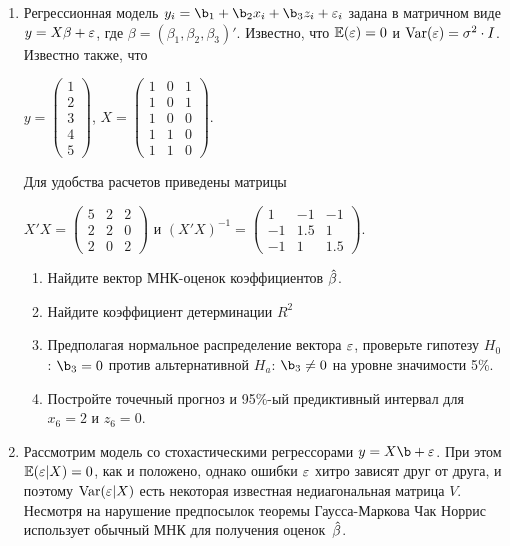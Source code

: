 \documentclass[12pt, a4paper]{article}
\theoremstyle{definition}
\begin{document}
\begin{enumerate}
\item Регрессионная модель $y_i=\b_1 + \b_2 x_i + \b_3 z_i + \e_i$  задана в матричном виде  $y=X\beta+\varepsilon$, где $\beta=(\beta_1,\beta_2,\beta_3)'$.
Известно, что $\operatorname{\mathbb{E}}(\varepsilon)=0$  и  $\operatorname{Var}(\varepsilon)=\sigma^2\cdot I$.
Известно также, что

$y=\left(
\begin{array}{c}
1\\
2\\
3\\
4\\
5
\end{array}\right)$,
$X=\left(\begin{array}{ccc}
1 & 0 & 1 \\
1 & 0 & 1 \\
1 & 0 & 0 \\
1 & 1 & 0 \\
1 & 1 & 0
\end{array}\right)$.


Для удобства расчетов приведены матрицы


$X'X=\left(
\begin{array}{ccc}
5 & 2 & 2\\
2 & 2 & 0\\
2 & 0 & 2
\end{array}\right)$ и $(X'X)^{-1}=\left(
\begin{array}{ccc}
1 & -1 & -1 \\
-1 & 1.5 & 1 \\
-1 & 1 & 1.5
\end{array}\right)$.

\begin{enumerate}
\item Найдите вектор МНК-оценок коэффициентов $\hat{\beta}$.
\item Найдите коэффициент детерминации $R^2$
\item Предполагая нормальное распределение вектора $\varepsilon$, проверьте гипотезу $H_0$: $\b_3=0$ против альтернативной $H_a$: $\b_3\neq 0$ на уровне значимости 5\%.
\item Постройте точечный прогноз и 95\%-ый предиктивный интервал для $x_6=2$ и $z_6=0$.
\end{enumerate}


\item Рассмотрим модель со стохастическими регрессорами $y=X\b + \e$. При этом $\operatorname{\mathbb{E}}(\varepsilon|X)=0$, как и положено, однако ошибки $\varepsilon$ хитро зависят друг от друга, и поэтому $\operatorname{Var}(\varepsilon|X)$ есть некоторая известная недиагональная матрица $V$. Несмотря на нарушение предпосылок теоремы Гаусса-Маркова Чак Норрис использует обычный МНК для получения оценок~$\hat{\beta}$.


\end{enumerate}
\end{document}
